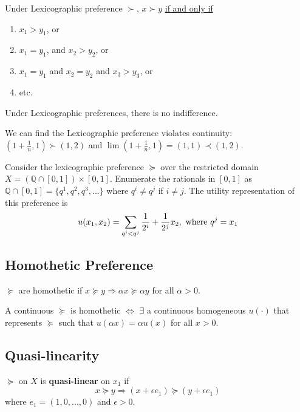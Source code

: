 \documentclass[11pt]{elegantbook}
\begin{document}
\begin{example}
    Under Lexicographic preference $\succ$, $x \succ y$ \underline{if and only if}
    \begin{enumerate}[$\circ$]
        \item $x_{1}>y_{1}$, or
        \item $x_{1}=y_{1}$, and $x_{2}>y_{2}$, or
        \item $x_{1}=y_{1}$ and $x_{2}=y_{2}$ and $x_{3}>y_{3}$, or
        \item etc.
    \end{enumerate}
    Under Lexicographic preferences, there is no indifference.
    
    We can find the Lexicographic preference violates continuity: $\left(1+\frac{1}{n}, 1\right) \succ(1,2)$ and $\lim \left(1+\frac{1}{n}, 1\right)=(1,1) \prec(1,2)$.
\end{example}

\begin{example}
    Consider the lexicographic preference $\succeq$ over the restricted domain $X=\left(\mathbb{Q}\cap[0,1]\right)\times [0,1]$. Enumerate the rationals in $[0,1]$ as $\mathbb{Q}\cap[0,1]=\{q^1,q^2,q^3,...\}$ where $q^i\neq q^j$ if $i\neq j$. The utility representation of this preference is
    $$u(x_1,x_2)=\sum_{q^i<q^j}\frac{1}{2^i}+\frac{1}{2^j}x_2, \textnormal{ where }q^j=x_1$$
\end{example}




\subsection{Homothetic Preference}
\begin{definition}[Homotheticity]
    \normalfont
    $\succeq$ are homothetic if $x\succeq y \Rightarrow \alpha x\succeq \alpha y$ for all $\alpha>0$.
\end{definition}

\begin{proposition}
    A continuous $\succeq$ is homothetic $\Leftrightarrow$ $\exists$ a continuous homogeneous $u(\cdot)$ that represents $\succeq$ such that $u(\alpha x)=\alpha u(x)$ for all $x>0$.
\end{proposition}


\subsection{Quasi-linearity}
\begin{definition}
    \normalfont
    $\succeq$ on $X$ is \textbf{quasi-linear} on $x_1$ if $$x\succeq y \Rightarrow (x+\epsilon e_1)\succeq (y+\epsilon e_1)$$ where $e_1=(1,0,...,0)$ and $\epsilon>0$.
\end{definition}
\end{document}
